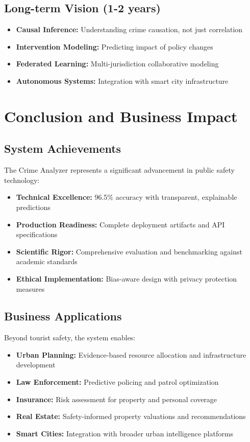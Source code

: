 \documentclass[11pt]{article}
\begin{document}
\subsection{Long-term Vision (1-2 years)}
\begin{itemize}[leftmargin=*]
\item \textbf{Causal Inference:} Understanding crime causation, not just correlation
\item \textbf{Intervention Modeling:} Predicting impact of policy changes
\item \textbf{Federated Learning:} Multi-jurisdiction collaborative modeling
\item \textbf{Autonomous Systems:} Integration with smart city infrastructure
\end{itemize}

\section{Conclusion and Business Impact}

\subsection{System Achievements}
The Crime Analyzer represents a significant advancement in public safety technology:
\begin{itemize}[leftmargin=*]
\item \textbf{Technical Excellence:} 96.5\% accuracy with transparent, explainable predictions
\item \textbf{Production Readiness:} Complete deployment artifacts and API specifications
\item \textbf{Scientific Rigor:} Comprehensive evaluation and benchmarking against academic standards
\item \textbf{Ethical Implementation:} Bias-aware design with privacy protection measures
\end{itemize}

\subsection{Business Applications}
Beyond tourist safety, the system enables:
\begin{itemize}[leftmargin=*]
\item \textbf{Urban Planning:} Evidence-based resource allocation and infrastructure development
\item \textbf{Law Enforcement:} Predictive policing and patrol optimization
\item \textbf{Insurance:} Risk assessment for property and personal coverage
\item \textbf{Real Estate:} Safety-informed property valuations and recommendations
\item \textbf{Smart Cities:} Integration with broader urban intelligence platforms
\end{itemize}
\end{document}
